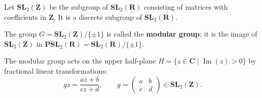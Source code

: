 Let $\mathbf{SL}_2(\mathbf{Z})$ be the subgroup of $\mathbf{SL}_2(\mathbf{R})$ consisting of matrices with coefficients in $\mathbf{Z}$. It is a discrete subgroup of $\mathbf{SL}_2(\mathbf{R})$.

The group $G = \mathbf{SL}_2(\mathbf{Z}) / \{\pm 1\}$ is called the \textbf{modular group}; it is the image of $\mathbf{SL}_2(\mathbf{Z})$ in $\mathbf{PSL}_2(\mathbf{R}) = \mathbf{SL}_2(\mathbf{R}) / \{\pm 1\}$.

The modular group acts on the upper half-plane $H = \{z \in \mathbf{C} \mid \operatorname{Im}(z) > 0\}$ by fractional linear transformations:
$$gz = \frac{az + b}{cz + d}, \qquad g = \begin{pmatrix} a & b \\ c & d \end{pmatrix} \in \mathbf{SL}_2(\mathbf{Z}).$$
